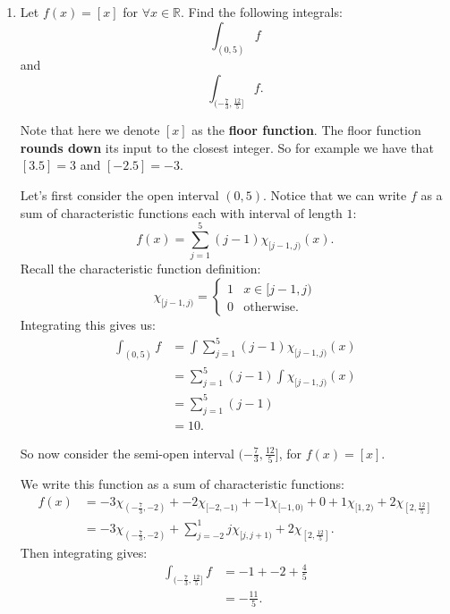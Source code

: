 \pagestyle{fancy}
\fancyhead{}

\begin{enumerate}
    \item Let $f(x)=[x]$ for $\forall x\in\mathbb{R}$.    Find the following integrals:
    $$\int_{(0,5)}f$$
    and
    $$\int_{(-\frac{7}{3},\frac{12}{5}]}f.$$
    
    Note that here we denote $[x]$ as the \textbf{floor function}. The floor function \textbf{rounds down} its input to the closest integer. So for example we have that $[3.5]=3$ and $[-2.5]=-3$.

    Let's first consider the open interval $(0,5)$. Notice that we can write $f$ as a sum of characteristic functions each with interval of length $1$:
    $$f(x)=\sum_{j=1}^{5}(j-1)\chi_{[j-1,j)}(x).$$
    Recall the characteristic function definition:
    $$\chi_{[j-1,j)} =
    \left\{
    \begin{array}{ll}
	1  & \mbox{} x \in [j-1,j) \\
	0 & \mbox{otherwise}.
    \end{array}
    \right.$$
    Integrating this gives us:
    \begin{align*}
        \int_{(0,5)}f
        &=\int\sum_{j=1}^{5}(j-1)\chi_{[j-1,j)}(x) \\
        &=\sum_{j=1}^{5}(j-1)\int\chi_{[j-1,j)}(x) \\
        &=\sum_{j=1}^{5}(j-1) \\
        &=10.
    \end{align*}

    \newpage

    So now consider the semi-open interval $(-\frac{7}{3},\frac{12}{5}]$, for $f(x)=[x]$.

    We write this function as a sum of characteristic functions:
    \begin{align*}
        f(x)
        &=-3\chi_{(-\frac{7}{3},-2)}+-2\chi_{[-2,-1)}+-1\chi_{[-1,0)}+0
        +1\chi_{[1,2)}+2\chi_{[2,\frac{12}{5}]} \\
        &=-3\chi_{(-\frac{7}{3},-2)}+\sum_{j=-2}^{1}j\chi_{[j,j+1)}+2\chi_{[2,\frac{12}{5}]}.
    \end{align*}
    Then integrating gives:
    \begin{align*}
        \int_{(-\frac{7}{3},\frac{12}{5}]}f
        &=-1+-2+\frac{4}{5} \\
        &=-\frac{11}{5}.
    \end{align*}


\end{enumerate}
